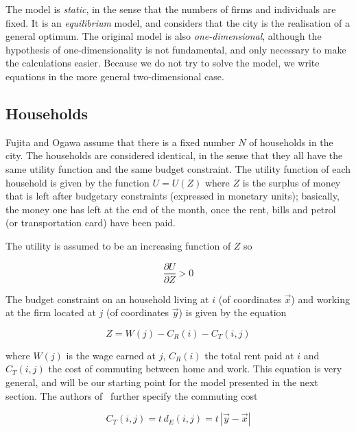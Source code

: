 The model is \emph{static}, in the sense that the numbers of firms and
individuals are fixed. It is an \emph{equilibrium} model, and considers that the
city is the realisation of a general optimum. The original model is also
\emph{one-dimensional}, although the hypothesis of one-dimensionality is not
fundamental, and only necessary to make the calculations easier. Because we 
do not try to solve the model, we write equations in the more general
two-dimensional case.

\subsection{Households} 
\label{sub:households}

Fujita and Ogawa assume that there is a fixed number $N$ of households in the
city. The households are considered identical, in the sense that they all have
the same utility function and the same budget constraint. The utility function
of each household is given by the function $U = U(Z)$ where $Z$ is the surplus
of money that is left after budgetary constraints (expressed in monetary units);
basically, the money one has left at the end of the month, once the rent, bills
and petrol (or transportation card) have been paid. 

The utility is assumed to be an increasing function of $Z$ so

\begin{equation}
    \frac{\partial U}{\partial Z} > 0
\end{equation}

The budget constraint on an household living at $i$ (of coordinates $\vec{x}$)
and working at the firm located at $j$ (of coordinates $\vec{y}$) is given by the
equation

\begin{equation}
    Z = W\left(j\right)
      - C_R\left(i\right)
      - C_T\left(i,j\right)
\end{equation} 

where $W\left(j\right)$ is the wage earned at $j$, $C_R\left(i\right)$ the total
rent paid at $i$ and $C_T\left(i,j\right)$ the cost of commuting between
home and work. This equation is very general, and will be our starting point for
the model presented in the next section. The authors of~\cite{Fujita:1982}
further specify the commuting cost

\begin{equation}
    C_T\left(i,j\right) = t\,d_E(i,j) = t\,\left|\vec{y}-\vec{x}\right|
\end{equation}


